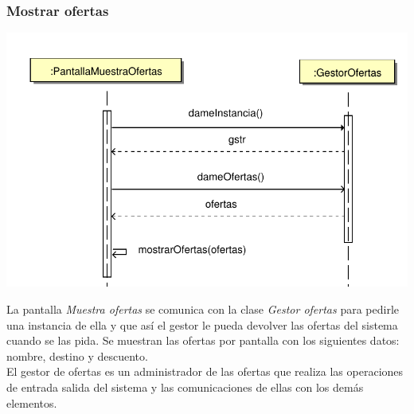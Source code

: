 \documentclass[11pt, a4paper, twoside, titlepage]{article}
\begin{document}
			\subsubsection{Mostrar ofertas}
				\begin{center}
					\includegraphics[scale=.7]{diseno/diagramas/mostrarofertas.pdf}
				\end{center}
				La pantalla {\itshape Muestra ofertas} se comunica con la clase {\itshape Gestor ofertas} para pedirle una instancia de ella y que así el gestor le pueda devolver las ofertas del sistema cuando se las pida. Se muestran las ofertas por pantalla con los siguientes datos: nombre, destino y descuento. \\
				
				El gestor de ofertas es un administrador de las ofertas que realiza las operaciones de entrada salida del sistema y las comunicaciones de ellas con los demás elementos.
\end{document}
